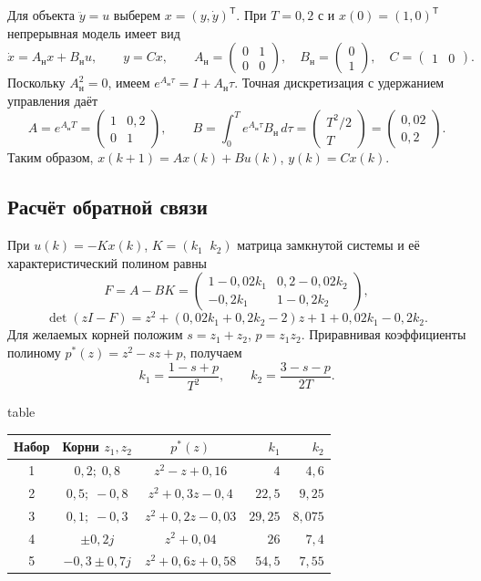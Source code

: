 Для объекта $\ddot y=u$ выберем $x=(y,\dot y)^{\mathsf T}$.
При $T=0{,}2$ с и $x(0)=(1,0)^{\mathsf T}$ непрерывная модель имеет вид
\[
  \dot x=A_{\text{н}}x+B_{\text{н}}u,\qquad y=Cx,
  \qquad
  A_{\text{н}}=\begin{pmatrix}0&1\\0&0\end{pmatrix},\quad
  B_{\text{н}}=\begin{pmatrix}0\\1\end{pmatrix},\quad
  C=\begin{pmatrix}1&0\end{pmatrix}.
\]
Поскольку $A_{\text{н}}^2=0$, имеем $e^{A_{\text{н}}\tau}=I+A_{\text{н}}\tau$.
Точная дискретизация с удержанием управления даёт
\[
  A=e^{A_{\text{н}}T}=\begin{pmatrix}1&0{,}2\\0&1\end{pmatrix},\qquad
  B=\int_0^T e^{A_{\text{н}}\tau}B_{\text{н}}\,d\tau
   =\begin{pmatrix}T^2/2\\T\end{pmatrix}
   =\begin{pmatrix}0{,}02\\0{,}2\end{pmatrix}.
\]
Таким образом, $x(k+1)=Ax(k)+Bu(k)$, $y(k)=Cx(k)$.

\subsection{Расчёт обратной связи}

При $u(k)=-Kx(k)$, $K=(k_1\;\;k_2)$ матрица замкнутой системы
и её характеристический полином равны
\[
  F=A-BK=
  \begin{pmatrix}
    1-0{,}02k_1 & 0{,}2-0{,}02k_2\\
    -0{,}2k_1 & 1-0{,}2k_2
  \end{pmatrix},
\]
\[
  \det(zI-F)=z^2+(0{,}02k_1+0{,}2k_2-2)z
                 +1+0{,}02k_1-0{,}2k_2.
\]
Для желаемых корней положим $s=z_1+z_2$, $p=z_1z_2$.
Приравнивая коэффициенты полиному $p^*(z)=z^2-sz+p$, получаем
\[
  k_1=\frac{1-s+p}{T^2},\qquad
  k_2=\frac{3-s-p}{2T}.
\]

\begin{reportblock}{table}
  \caption{Желаемые корни и коэффициенты обратной связи}
  \label{tab:task2-roots}
  \begin{tabular}{c c c r r}
    \toprule
    Набор & Корни $z_1,z_2$ & $p^*(z)$ & $k_1$ & $k_2$ \\
    \midrule
    1 & $0{,}2;\;0{,}8$ & $z^2-z+0{,}16$ & $4$ & $4{,}6$ \\
    2 & $0{,}5;\;-0{,}8$ & $z^2+0{,}3z-0{,}4$ & $22{,}5$ & $9{,}25$ \\
    3 & $0{,}1;\;-0{,}3$ & $z^2+0{,}2z-0{,}03$ & $29{,}25$ & $8{,}075$ \\
    4 & $\pm0{,}2j$ & $z^2+0{,}04$ & $26$ & $7{,}4$ \\
    5 & $-0{,}3\pm0{,}7j$ & $z^2+0{,}6z+0{,}58$ & $54{,}5$ & $7{,}55$ \\
    \bottomrule
  \end{tabular}
\end{reportblock}

